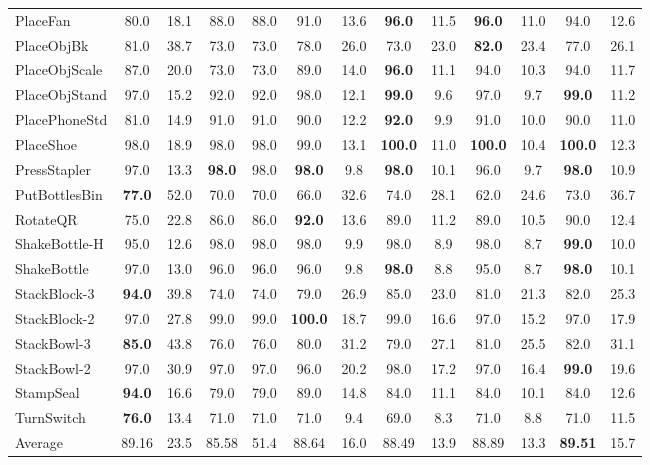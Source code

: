 \documentclass{article}
\begin{document}
\begin{table}[t]
\begin{tabular}{@{}lcccccccccccc@{}}
PlaceFan       & 80.0 & 18.1 & 88.0 & 88.0 & 91.0 & 13.6 & \textbf{96.0} & 11.5 & \textbf{96.0} & 11.0 & 94.0 & 12.6 \\
PlaceObjBk     & 81.0 & 38.7 & 73.0 & 73.0 & 78.0 & 26.0 & 73.0 & 23.0 & \textbf{82.0} & 23.4 & 77.0 & 26.1 \\
PlaceObjScale  & 87.0 & 20.0 & 73.0 & 73.0 & 89.0 & 14.0 & \textbf{96.0} & 11.1 & 94.0 & 10.3 & 94.0 & 11.7 \\
PlaceObjStand  & 97.0 & 15.2 & 92.0 & 92.0 & 98.0 & 12.1 & \textbf{99.0} & 9.6 & 97.0 & 9.7 & \textbf{99.0} & 11.2 \\
PlacePhoneStd  & 81.0 & 14.9 & 91.0 & 91.0 & 90.0 & 12.2 & \textbf{92.0} & 9.9 & 91.0 & 10.0 & 90.0 & 11.0 \\
PlaceShoe      & 98.0 & 18.9 & 98.0 & 98.0 & 99.0 & 13.1 & \textbf{100.0} & 11.0 & \textbf{100.0} & 10.4 & \textbf{100.0} & 12.3 \\
PressStapler   & 97.0 & 13.3 & \textbf{98.0} & 98.0 & \textbf{98.0} & 9.8 & \textbf{98.0} & 10.1 & 96.0 & 9.7 & \textbf{98.0} & 10.9 \\
PutBottlesBin  & \textbf{77.0} & 52.0 & 70.0 & 70.0 & 66.0 & 32.6 & 74.0 & 28.1 & 62.0 & 24.6 & 73.0 & 36.7 \\
RotateQR       & 75.0 & 22.8 & 86.0 & 86.0 & \textbf{92.0} & 13.6 & 89.0 & 11.2 & 89.0 & 10.5 & 90.0 & 12.4 \\
ShakeBottle-H  & 95.0 & 12.6 & 98.0 & 98.0 & 98.0 & 9.9 & 98.0 & 8.9 & 98.0 & 8.7 & \textbf{99.0} & 10.0 \\
ShakeBottle    & 97.0 & 13.0 & 96.0 & 96.0 & 96.0 & 9.8 & \textbf{98.0} & 8.8 & 95.0 & 8.7 & \textbf{98.0} & 10.1 \\
StackBlock-3   & \textbf{94.0} & 39.8 & 74.0 & 74.0 & 79.0 & 26.9 & 85.0 & 23.0 & 81.0 & 21.3 & 82.0 & 25.3 \\
StackBlock-2   & 97.0 & 27.8 & 99.0 & 99.0 & \textbf{100.0} & 18.7 & 99.0 & 16.6 & 97.0 & 15.2 & 97.0 & 17.9 \\
StackBowl-3    & \textbf{85.0} & 43.8 & 76.0 & 76.0 & 80.0 & 31.2 & 79.0 & 27.1 & 81.0 & 25.5 & 82.0 & 31.1 \\
StackBowl-2    & 97.0 & 30.9 & 97.0 & 97.0 & 96.0 & 20.2 & 98.0 & 17.2 & 97.0 & 16.4 & \textbf{99.0} & 19.6 \\
StampSeal      & \textbf{94.0} & 16.6 & 79.0 & 79.0 & 89.0 & 14.8 & 84.0 & 11.1 & 84.0 & 10.1 & 84.0 & 12.6 \\
TurnSwitch     & \textbf{76.0} & 13.4 & 71.0 & 71.0 & 71.0 & 9.4 & 69.0 & 8.3 & 71.0 & 8.8 & 71.0 & 11.5 \\
\midrule
Average        & 89.16 & 23.5 & 85.58 & 51.4 & 88.64 & 16.0 & 88.49 & 13.9 & 88.89 & 13.3 & \textbf{89.51} & 15.7 \\
\bottomrule
\end{tabular}
\end{table}
\end{document}
